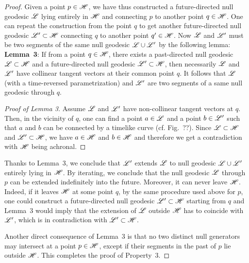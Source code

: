 \begin{proof}
Given a point $p\in\mathscr{H}$, we have thus constructed a
future-directed null geodesic $\mathscr{L}$ lying entirely in $\mathscr{H}$ and
connecting $p$ to another point $q\in\mathscr{H}$. One can
repeat the construction
from the point $q$ to get another future-directed null geodesic $\mathscr{L}'\subset\mathscr{H}$
connecting $q$ to another point $q'\in\mathscr{H}$. Now $\mathscr{L}$ and $\mathscr{L}'$ must
be two segments of the same null geodesic $\mathscr{L}\cup\mathscr{L}'$ by the following lemma:\\[1ex]
\textbf{Lemma~3}: If from a point $q\in\mathscr{H}$, there exists a past-directed
null geodesic $\mathscr{L}\subset\mathscr{H}$ and a future-directed null geodesic $\mathscr{L}'\subset\mathscr{H}$,
then necessarily $\mathscr{L}$ and $\mathscr{L}'$ have collinear tangent vectors at their common point $q$.
It follows that $\mathscr{L}$ (with a time-reversed parametrization) and $\mathscr{L}'$ are two segments
of a same null geodesic through $q$.
\begin{proof}[Proof of Lemma 3]
Assume $\mathscr{L}$ and $\mathscr{L}'$ have non-collinear tangent vectors at $q$. Then, in
the vicinity of $q$, one can find a point $a\in\mathscr{L}$ and a point $b\in\mathscr{L}'$
such that $a$ and $b$ can be connected by a timelike curve (cf.
Fig.~??). Since $\mathscr{L}\subset\mathscr{H}$ and $\mathscr{L}'\subset\mathscr{H}$, we have $a\in\mathscr{H}$ and
$b\in\mathscr{H}$ and therefore we get a contradiction with $\mathscr{H}$ being achronal.
\end{proof}
Thanks to Lemma~3, we conclude that $\mathscr{L}'$ extends $\mathscr{L}$ to null geodesic
$\mathscr{L}\cup\mathscr{L}'$ entirely lying in $\mathscr{H}$. By iterating, we conclude that
the null geodesic $\mathscr{L}$ through $p$ can be extended indefinitely into the
future. Moreover, it can never leave $\mathscr{H}$. Indeed, if it leaves $\mathscr{H}$ at
some point $q$, by the same procedure used above for $p$, one could construct a future-directed null geodesic
$\mathscr{L}'\subset\mathscr{H}$ starting from $q$ and Lemma~3 would imply that
the extension of $\mathscr{L}$ outside $\mathscr{H}$ has to coincide with $\mathscr{L}'$, which is
in contradiction with $\mathscr{L}'\subset\mathscr{H}$.

Another direct consequence of Lemma~3 is that no two distinct null generators
may intersect at a point $p\in\mathscr{H}$, except if their segments in the past of
$p$ lie outside $\mathscr{H}$.
This completes the proof of Property~3.
\end{proof}



